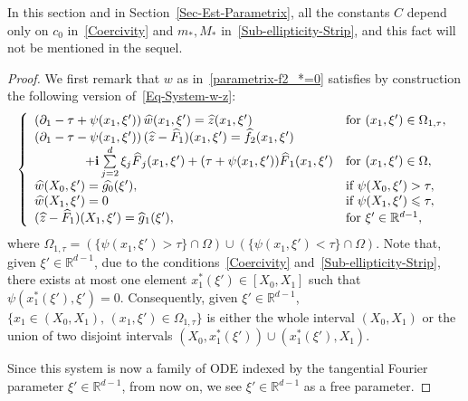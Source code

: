 \documentclass[10pt]{amsart}
\theoremstyle{definition}\newtheorem{defi}[theo]{Definition}\newtheorem{rema}[theo]{Remark}\newtheorem{exam}[theo]{Example}\newtheorem{exem}[theo]{Example}\newtheorem{nota}[theo]{Notation}
\newcommand*\R{\mathbb{R}}
\renewcommand{\i}{\mathbf{i}}
\renewcommand{\leq}{\leqslant}
\renewcommand{\hat}{\widehat}
\let\oldhat\hat
\renewcommand*{\hat}[1]{\mathchoice{\widehat{#1}}{\widehat{#1}}{\oldhat{#1}}{\oldhat{#1}}}
\begin{document}
In this section and in Section~\ref{Sec-Est-Parametrix}, all the constants $C$ depend only on $c_0$ in~\eqref{Coercivity} and $m_*, M_*$ in~\eqref{Sub-ellipticity-Strip}, and this fact will not be mentioned in the sequel.

\begin{proof}
We first remark that $w$ as in~\eqref{parametrix-f2_*=0} satisfies by construction the following version of~\eqref{Eq-System-w-z}:
\begin{equation}\label{Eq-System-w-z-bis}
\left\{
\begin{array}{ll}
\left(\partial_1-\tau+\psi(x_1,\xi') \right) \widehat{w}(x_1,\xi')=\widehat{z}(x_1,\xi') &\text{for } (x_1, \xi') \in \Omega_{1,\tau},
\\
\left(\partial_1-\tau-\psi(x_1,\xi') \right)(\widehat{z} - \widehat F_1)(x_1,\xi')=\widehat f_2(x_1, \xi')
\\
\qquad\qquad + \i \sum\limits_{j=2}^d \xi_j \hat F_j(x_1, \xi') + (\tau + \psi(x_1, \xi')) \hat F_1(x_1, \xi') &\text{for } (x_1, \xi') \in \Omega,
\\
\widehat{w}(X_0,\xi')= \widehat{g_0}(\xi'), &\text{if } \psi(X_0, \xi') > \tau,
\\
\widehat{w}(X_1,\xi')= 0 &\text{if } \psi(X_1, \xi') \leq \tau,
\\
(\widehat z -\widehat F_1)(X_1, \xi') = \hat g_1 (\xi'), &\text{for } \xi' \in \R^{d-1},
\end{array}
\right.
\end{equation}
where $\Omega_{1,\tau} = (\{ \psi(x_1, \xi') > \tau\} \cap \Omega) \cup (\{ \psi(x_1, \xi') < \tau\} \cap \Omega)$. Note that, given $\xi' \in \R^{d-1}$, due to the conditions~\eqref{Coercivity} and~\eqref{Sub-ellipticity-Strip}, there exists at most one element $x_1^*(\xi') \in [X_0, X_1]$ such that $\psi(x_1^*(\xi'), \xi') = 0$. Consequently, given $\xi' \in \R^{d-1}$, $\{ x_1 \in (X_0, X_1), \, (x_1, \xi') \in \Omega_{1, \tau} \}$ is either the whole interval $(X_0, X_1)$ or the union of two disjoint intervals $(X_0, x_1^*(\xi')) \cup (x_1^*(\xi'), X_1)$.


Since this system is now a family of ODE indexed by the tangential Fourier parameter $\xi' \in \R^{d-1}$, from now on, we see $\xi' \in \R^{d-1}$ as a free parameter.


\end{proof}
\end{document}
